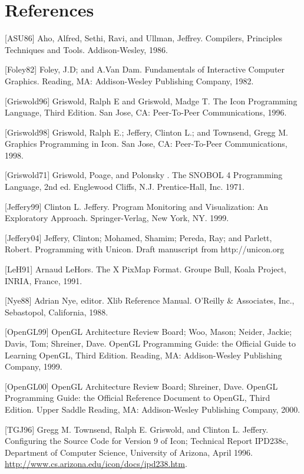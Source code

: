 \clearpage\section{References}

[ASU86] Aho, Alfred, Sethi, Ravi, and Ullman, Jeffrey. Compilers,
Principles Techniques and Tools. Addison-Wesley, 1986.

[Foley82] Foley, J.D; and A.Van Dam. Fundamentals of Interactive
Computer Graphics. Reading, MA: Addison-Wesley Publishing Company,
1982.

[Griswold96] Griswold, Ralph E and Griswold, Madge T. The Icon
Programming Language, Third Edition. San Jose, CA: Peer-To-Peer
Communications, 1996.

[Griswold98] Griswold, Ralph E.; Jeffery, Clinton L.; and Townsend,
Gregg M. Graphics Programming in Icon. San Jose, CA: Peer-To-Peer
Communications, 1998.

[Griswold71] Griswold, Poage, and Polonsky . The SNOBOL 4 Programming
Language, 2nd ed. Englewood Cliffs, N.J.  Prentice-Hall, Inc. 1971.

[Jeffery99] Clinton L. Jeffery. Program Monitoring and Visualization:
An Exploratory Approach.  Springer-Verlag, New York, NY. 1999.

[Jeffery04] Jeffery, Clinton; Mohamed, Shamim; Pereda, Ray; and
Parlett, Robert. Programming with Unicon. Draft manuscript from
http://unicon.org

[LeH91] Arnaud LeHors. The X PixMap Format. Groupe Bull, Koala
Project, INRIA, France, 1991.

[Nye88] Adrian Nye, editor. Xlib Reference Manual. O'Reilly \&
Associates, Inc., Sebastopol, California, 1988.

[OpenGL99] OpenGL Architecture Review Board; Woo, Mason; Neider,
Jackie; Davis, Tom; Shreiner, Dave. OpenGL Programming Guide: the
Official Guide to Learning OpenGL, Third Edition. Reading, MA:
Addison-Wesley Publishing Company, 1999.

[OpenGL00] OpenGL Architecture Review Board; Shreiner, Dave. OpenGL
Programming Guide: the Official Reference Document to OpenGL, Third
Edition. Upper Saddle Reading, MA: Addison-Wesley Publishing Company,
2000.

[TGJ96] Gregg M. Townsend, Ralph E. Griswold, and Clinton
L. Jeffery. Configuring the Source Code for Version 9 of Icon;
Technical Report IPD238c, Department of Computer Science, University
of Arizona, April 1996.\newline
\url{http://www.cs.arizona.edu/icon/docs/ipd238.htm}.

